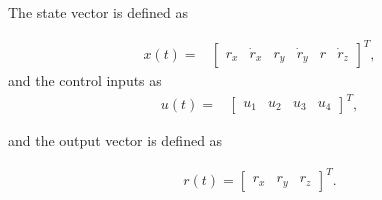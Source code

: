 The state vector is defined as

\begin{align*}
x(t)=&
\begin{bmatrix}
r_x & \dot{r}_x & r_y & \dot{r}_y & r &\dot{r}_z 
\end{bmatrix}^T,
\end{align*}
and the control inputs as
\begin{align*}
u(t)=&
\begin{bmatrix}
u_1 & u_2 &u_3 & u_4
\end{bmatrix}^T,
\end{align*}

and the output vector is defined as

\begin{align*}
r(t)=
\begin{bmatrix}
r_{x} & r_{y} & r_{z}
\end{bmatrix}^T.
\end{align*}
